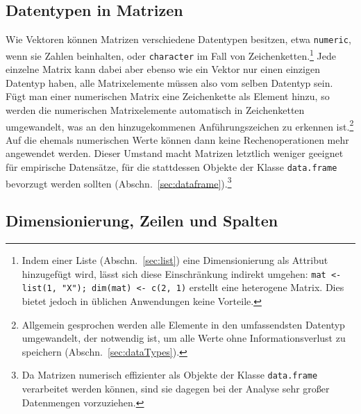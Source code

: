 \subsection{Datentypen in Matrizen}
\label{sec:matDataTypes}

Wie Vektoren können Matrizen verschiedene Datentypen besitzen, etwa \lstinline!numeric!, wenn sie Zahlen beinhalten, oder \lstinline!character! im Fall von Zeichenketten.\footnote{Indem einer Liste (Abschn.\ \ref{sec:list}) eine Dimensionierung als Attribut hinzugefügt wird, lässt sich diese Einschränkung indirekt umgehen: \lstinline!mat <- list(1, "X"); dim(mat) <- c(2, 1)! erstellt eine heterogene Matrix. Dies bietet jedoch in üblichen Anwendungen keine Vorteile.} Jede einzelne Matrix kann dabei aber ebenso wie ein Vektor nur einen einzigen Datentyp haben, alle Matrixelemente müssen also vom selben Datentyp sein. Fügt man einer numerischen Matrix eine Zeichenkette als Element hinzu, so werden die numerischen Matrixelemente automatisch in Zeichenketten umgewandelt, was an den hinzugekommenen Anführungszeichen zu erkennen ist.\footnote{Allgemein gesprochen werden alle Elemente in den umfassendsten Datentyp umgewandelt, der notwendig ist, um alle Werte ohne Informationsverlust zu speichern (Abschn.\ \ref{sec:dataTypes}).} Auf die ehemals numerischen Werte können dann keine Rechenoperationen mehr angewendet werden. Dieser Umstand macht Matrizen letztlich weniger geeignet für empirische Datensätze, für die stattdessen Objekte der Klasse \lstinline!data.frame! bevorzugt werden sollten (Abschn.\ \ref{sec:dataframe}).\footnote{Da Matrizen numerisch effizienter als Objekte der Klasse \lstinline!data.frame! verarbeitet werden können, sind sie dagegen bei der Analyse sehr großer Datenmengen vorzuziehen.}

\subsection{Dimensionierung, Zeilen und Spalten}
\label{sec:asVecMat}


